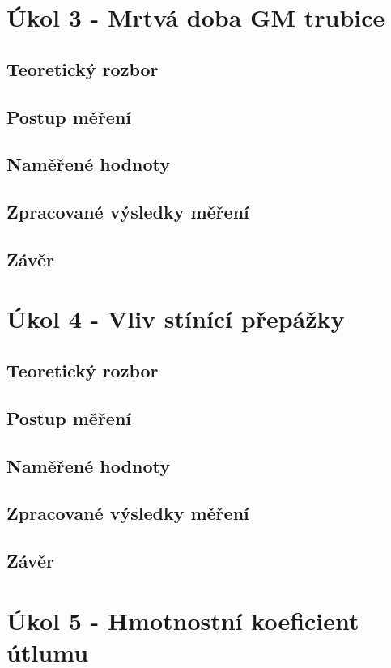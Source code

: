 \documentclass{protokol}
\begin{document}
\section{Úkol 3 - Mrtvá doba GM trubice}
    \subsection{Teoretický rozbor}
    \subsection{Postup měření}
    \subsection{Naměřené hodnoty}   
    \subsection{Zpracované výsledky měření}
    \subsection{Závěr}

\pagebreak

\section{Úkol 4 - Vliv stínící přepážky}
    \subsection{Teoretický rozbor}
    \subsection{Postup měření}
    \subsection{Naměřené hodnoty}   
    \subsection{Zpracované výsledky měření}
    \subsection{Závěr}

\pagebreak

\section{Úkol 5 - Hmotnostní koeficient útlumu}
\end{document}
